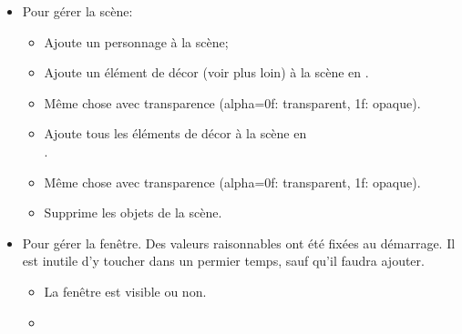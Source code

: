 \documentclass[11pt]{article}
\begin{document}
\begin{itemize}
    \item Pour gérer la scène:
    \begin{itemize}

        \item {}
        
            Ajoute un personnage à la scène;

        \item {}

            Ajoute un élément de décor  (voir plus loin) à la scène en .

        \item {}
        
            Même chose avec transparence (alpha=0f: transparent, 1f: opaque).

        \item {}
        
            Ajoute tous les éléments de décor  à la scène en \\.

        \item {}
    
            Même chose avec transparence (alpha=0f: transparent, 1f: opaque).

        \item {}
        
            Supprime les objets de la scène.

    \end{itemize}

    \item Pour gérer la fenêtre. Des valeurs raisonnables ont été fixées au démarrage. Il est inutile d'y toucher dans un permier temps, sauf 
     qu'il faudra ajouter.
     
    \begin{itemize}
        \item {}
        
        La fenêtre est visible ou non.


        \item {}


\end{itemize}
\end{itemize}
\end{document}
